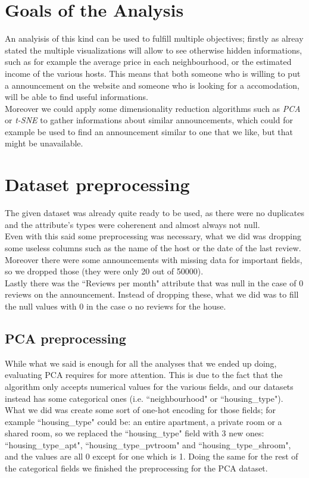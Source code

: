 \documentclass[11pt]{article}
\begin{document}
\section{Goals of the Analysis}
An analyisis of this kind can be used to fulfill multiple objectives; firstly as alreay stated the multiple visualizations will allow to see otherwise hidden informations, such as for example the average price in each neighbourhood, or the estimated income of the various hosts. This means that both someone who is willing to put a announcement on the website and someone who is looking for a accomodation, will be able to find useful informations.\\
Moreover we could apply some dimensionality reduction algorithms such as {\em PCA} or {\em t-SNE} to gather informations about similar announcements, which could for example be used to find an announcement similar to one that we like, but that might be unavailable.

\section{Dataset preprocessing}
The given dataset was already quite ready to be used, as there were no duplicates and the attribute's types were coherenent and almost always not null.\\
Even with this said some preprocessing was necessary, what we did was dropping some useless columns such as the name of the host or the date of the last review.\\
Moreover there were some announcements with missing data for important fields, so we dropped those (they were only 20 out of 50000).\\
Lastly there was the ``Reviews per month" attribute that was null in the case of 0 reviews on the announcement. Instead of dropping these, what we did was to fill the null values with 0 in the case o no reviews for the house.

\subsection{PCA preprocessing}
While what we said is enough for all the analyses that we ended up doing, evaluating PCA requires for more attention. This is due to the fact that the algorithm only accepts numerical values for the various fields, and our datasets instead has some categorical ones (i.e. ``neighbourhood" or ``housing\_type"). What we did was create some sort of one-hot encoding for those fields; for example ``housing\_type" could be: an entire apartment, a private room or a shared room, so we replaced the ``housing\_type" field with 3 new ones: ``housing\_type\_apt", ``housing\_type\_pvtroom" and ``housing\_type\_shroom", and the values are all 0 except for one which is 1. Doing the same for the rest of the categorical fields we finished the preprocessing for the PCA dataset.
\end{document}
